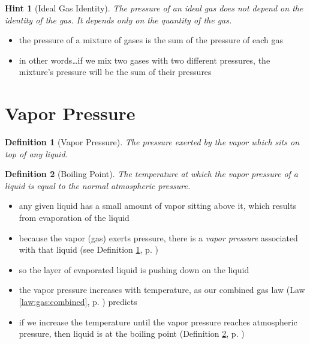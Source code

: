 \documentclass[11pt, oneside]{article}   	%
\newtheorem{definition}{Definition}
\newtheorem{hint}{Hint}
\begin{document}
\begin{hint}[Ideal Gas Identity]\label{hint:ideal-gas-identity}
The pressure of an ideal gas does not depend on the identity of the gas.
It depends only on the quantity of the gas.
\end{hint}

\begin{itemize}
\item the pressure of a mixture of gases is the sum of the pressure of each gas
\item in other words\ldots if we mix two gases with two different pressures, the mixture's pressure will be the sum of their pressures
\end{itemize}


\section{Vapor Pressure}

\begin{definition}[Vapor Pressure]\label{defn:vapor-pressure}
The pressure exerted by the vapor which sits on top of any liquid.
\end{definition}

\begin{definition}[Boiling Point]\label{defn:boiling-point}
The temperature at which the vapor pressure of a liquid is equal to the normal atmospheric pressure.
\end{definition}

\begin{itemize}
\item any given liquid has a small amount of vapor sitting above it, which results from evaporation of the liquid
\item because the vapor (gas) exerts pressure, there is a \emph{vapor pressure} associated with that liquid (see Definition \ref{defn:vapor-pressure}, p. \pageref{defn:vapor-pressure})
\item so the layer of evaporated liquid is pushing down on the liquid
\item the vapor pressure increases with temperature, as our combined gas law (Law \ref{law:gas:combined}, p. \pageref{law:gas:combined}) predicts
\item if we increase the temperature until the vapor pressure reaches atmospheric pressure, then liquid is at the boiling point (Definition \ref{defn:boiling-point}, p. \pageref{defn:boiling-point})
\end{itemize}
\end{document}
